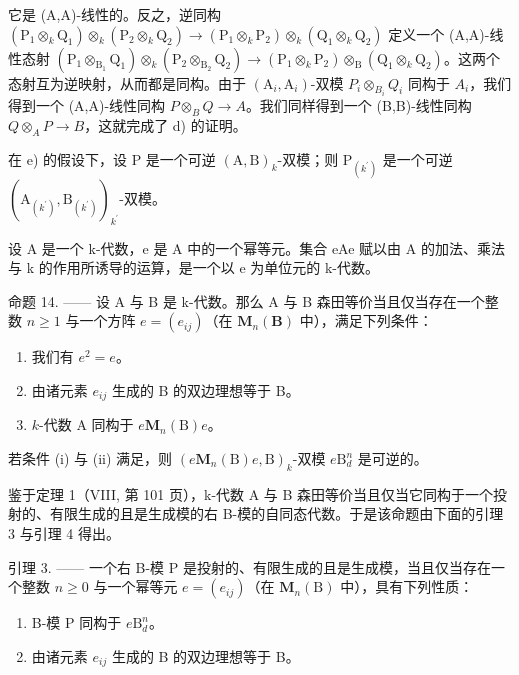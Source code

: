它是 (A,A)-线性的。反之，逆同构 \((\mathrm{P}_{1}\otimes_{k}\mathrm{Q}_{1})\otimes_{k}(\mathrm{P}_{2}\otimes_{k}\mathrm{Q}_{2})\to(\mathrm{P}_{1}\otimes_{k}\mathrm{P}_{2})\otimes_{k}(\mathrm{Q}_{1}\otimes_{k}\mathrm{Q}_{2})\) 定义一个 (A,A)-线性态射 \((\mathrm{P}_{1}\otimes_{\mathrm{B}_{1}}\mathrm{Q}_{1})\otimes_{k}(\mathrm{P}_{2}\otimes_{\mathrm{B}_{2}}\mathrm{Q}_{2})\to(\mathrm{P}_{1}\otimes_{k}\mathrm{P}_{2})\otimes_{\mathrm{B}}(\mathrm{Q}_{1}\otimes_{k}\mathrm{Q}_{2})\)。这两个态射互为逆映射，从而都是同构。由于 \((\mathrm{A}_{i},\mathrm{A}_{i})\)-双模 \(P_{i}\otimes_{B_{i}}Q_{i}\) 同构于 \(A_{i}\)，我们得到一个 (A,A)-线性同构 \(P\otimes_{B}Q\to A\)。我们同样得到一个 (B,B)-线性同构 \(Q\otimes_{A}P\to B\)，这就完成了 d) 的证明。

在 e) 的假设下，设 P 是一个可逆 \((\mathrm{A},\mathrm{B})_{k}\)-双模；则 \(\mathrm{P}_{(k^{\prime})}\) 是一个可逆 \((\mathrm{A}_{(k^{\prime})},\mathrm{B}_{(k^{\prime})})_{k^{\prime}}\)-双模。

设 A 是一个 k-代数，e 是 A 中的一个幂等元。集合 eAe 赋以由 A 的加法、乘法与 k 的作用所诱导的运算，是一个以 e 为单位元的 k-代数。

命题 14. —— 设 A 与 B 是 k-代数。那么 A 与 B 森田等价当且仅当存在一个整数 \(n \geqslant 1\) 与一个方阵 \(e = (e_{ij})\)（在 \(\mathbf{M}_{n}(\mathbf{B})\) 中），满足下列条件：

\begin{enumerate}
\def\labelenumi{(\roman{enumi})}
\item
  我们有 \(e^2 = e\)。
\item
  由诸元素 \(e_{ij}\) 生成的 B 的双边理想等于 B。
\item
  \(k\)-代数 A 同构于 \(e\mathbf{M}_n(\mathrm{B})e\)。
\end{enumerate}

若条件 (i) 与 (ii) 满足，则 \((e\mathbf{M}_n(\mathrm{B})e,\mathrm{B})_k\)-双模 \(e\mathrm{B}_d^n\) 是可逆的。

鉴于定理 1（VIII, 第 101 页），k-代数 A 与 B 森田等价当且仅当它同构于一个投射的、有限生成的且是生成模的右 B-模的自同态代数。于是该命题由下面的引理 3 与引理 4 得出。

引理 3. —— 一个右 B-模 P 是投射的、有限生成的且是生成模，当且仅当存在一个整数 \(n \geqslant 0\) 与一个幂等元 \(e = (e_{ij})\)（在 \(\mathbf{M}_n(\mathrm{B})\) 中），具有下列性质：

\begin{enumerate}
\def\labelenumi{(\roman{enumi})}
\item
  B-模 P 同构于 \(e\mathrm{B}_d^n\)。
\item
  由诸元素 \(e_{ij}\) 生成的 B 的双边理想等于 B。
\end{enumerate}

